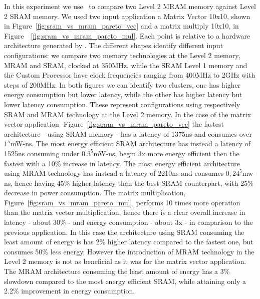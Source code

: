 In this experiment we use \frameworkname~to compare two Level 2 MRAM memory against Level 2 SRAM memory. We used two input application a Matrix Vector 10x10, shown in Figure~\ref{fig:sram_vs_mram_pareto_vec} and a matrix multiply 10x10, in Figure~~\ref{fig:sram_vs_mram_pareto_mul}. Each point is relative to a hardware architecture generated by \frameworkname. The different shapes identify different input configurations: we compare two memory technologies at the Level 2 memory, MRAM and SRAM, clocked at 350MHz, while the SRAM Level 1 memory and the Custom Processor have clock frequencies ranging from 400MHz to 2GHz with steps of 200MHz. In both figures we can identify two clusters, one has higher energy consumption but lower latency, while the other has higher latency but lower latency consumption. These represent  configurations using respectively SRAM and MRAM technology at the Level 2 memory. In the case of the matrix vector application -Figure~\ref{fig:sram_vs_mram_pareto_vec} the fastest architecture - using SRAM memory - has a latency of 1375ns and consumes over $1^5$mW-ns. The most energy efficient SRAM architecture has instead a latency of 1525ns consuming under $0.3^5$mW-ns, begin 3x more energy efficient then the fastest with a 10\% increase in latency. The most energy efficient architecture using MRAM technology has instead a latency of 2210ns and consumes $0,24^5$mw-ns, hence having 45\% higher latency than the best SRAM counterpart, with 25\% decrease in power consumption. The matrix multiplication, Figure~\ref{fig:sram_vs_mram_pareto_mul}, performs 10 times more operation than the matrix vector multiplication, hence there is a clear overall increase in latency - about 30\% - and energy consumption - about 3x -  in comparison to the previous application. In this case the architecture using SRAM consuming the least amount of energy is has 2\% higher latency compared to the fastest one, but consumes 50\% less energy. However the introduction of MRAM technology in the Level 2 memory is not as beneficial as it was for the matrix vector application. The MRAM architecture consuming the least amount of energy has a 3\% slowdown compared to the most energy efficient SRAM, while attaining only a 2.2\% improvement in energy consumption. 



